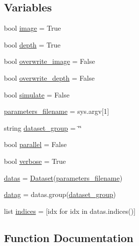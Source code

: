 \subsection*{Variables}
\begin{DoxyCompactItemize}
\item 
bool \hyperlink{namespaceexport__for__vsrs_ad5a496494e734ba71579653b24aa1f48}{image} = True
\item 
bool \hyperlink{namespaceexport__for__vsrs_a42168d88de1f21a9d3e767d54e3b93f3}{depth} = True
\item 
bool \hyperlink{namespaceexport__for__vsrs_aa5ec74176e45ab6f4dc1e8fa5e4190b8}{overwrite\+\_\+image} = False
\item 
bool \hyperlink{namespaceexport__for__vsrs_a3bd825d865a68f2a90e102b8c6c15d28}{overwrite\+\_\+depth} = False
\item 
bool \hyperlink{namespaceexport__for__vsrs_a553d224871aaf86fb6d6c63318f75d4f}{simulate} = False
\item 
\hyperlink{namespaceexport__for__vsrs_ad5b2c5f784d97cc82af334e29a2d3b78}{parameters\+\_\+filename} = sys.\+argv\mbox{[}1\mbox{]}
\item 
string \hyperlink{namespaceexport__for__vsrs_a297c8c592252592340006c68ab0ca00c}{dataset\+\_\+group} = \char`\"{}\char`\"{}
\item 
bool \hyperlink{namespaceexport__for__vsrs_ada70761c518dcc920057ee9d5baeab0b}{parallel} = False
\item 
bool \hyperlink{namespaceexport__for__vsrs_a91f5948087e0712f96dad76a670673b0}{verbose} = True
\item 
\hyperlink{namespaceexport__for__vsrs_a9fa3084ff05af121c752cec1a48a96f6}{datas} = \hyperlink{classpylib_1_1dataset_1_1Dataset}{Dataset}(\hyperlink{namespaceexport__for__vsrs_ad5b2c5f784d97cc82af334e29a2d3b78}{parameters\+\_\+filename})
\item 
\hyperlink{namespaceexport__for__vsrs_a5b30bd98d9fa1b05abdfb7091d19fecd}{datag} = datas.\+group(\hyperlink{namespaceexport__for__vsrs_a297c8c592252592340006c68ab0ca00c}{dataset\+\_\+group})
\item 
list \hyperlink{namespaceexport__for__vsrs_a53ea65c4d85ec7f9158c71ec7b1e7848}{indices} = \mbox{[}idx for idx in datas.\+indices()\mbox{]}
\end{DoxyCompactItemize}


\subsection{Function Documentation}
